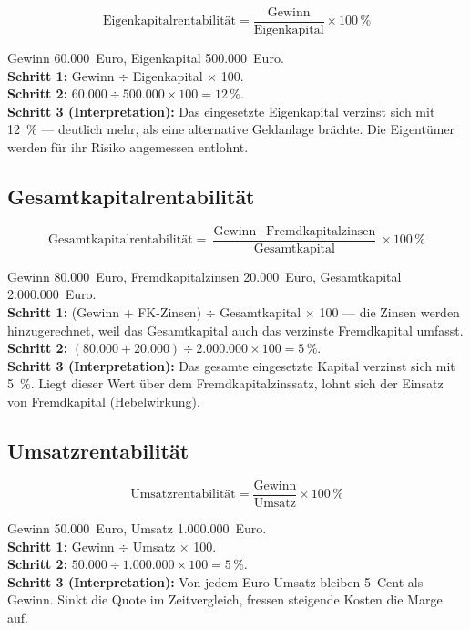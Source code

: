 \documentclass[11pt, a4paper]{article}
\begin{document}
\[
\mbox{Eigenkapitalrentabilität} = \frac{\mbox{Gewinn}}{\mbox{Eigenkapital}} \times 100\,\%
\]

\begin{beispiel}[title={Beispiel: Eigenkapitalrentabilität}]
Gewinn 60.000~Euro, Eigenkapital 500.000~Euro.\\
\textbf{Schritt 1:} Gewinn $\div$ Eigenkapital $\times$ 100.\\
\textbf{Schritt 2:} $60.000 \div 500.000 \times 100 = 12\,\%$.\\
\textbf{Schritt 3 (Interpretation):} Das eingesetzte Eigenkapital verzinst sich mit
12~\% --- deutlich mehr, als eine alternative Geldanlage brächte. Die Eigentümer werden
für ihr Risiko angemessen entlohnt.
\end{beispiel}

\subsection{Gesamtkapitalrentabilität}

\[
\mbox{Gesamtkapitalrentabilität} =
\frac{\mbox{Gewinn} + \mbox{Fremdkapitalzinsen}}{\mbox{Gesamtkapital}} \times 100\,\%
\]

\begin{beispiel}[title={Beispiel: Gesamtkapitalrentabilität}]
Gewinn 80.000~Euro, Fremdkapitalzinsen 20.000~Euro, Gesamtkapital 2.000.000~Euro.\\
\textbf{Schritt 1:} (Gewinn + FK-Zinsen) $\div$ Gesamtkapital $\times$ 100 --- die
Zinsen werden hinzugerechnet, weil das Gesamtkapital auch das verzinste Fremdkapital
umfasst.\\
\textbf{Schritt 2:} $(80.000 + 20.000) \div 2.000.000 \times 100 = 5\,\%$.\\
\textbf{Schritt 3 (Interpretation):} Das gesamte eingesetzte Kapital verzinst sich mit
5~\%. Liegt dieser Wert über dem Fremdkapitalzinssatz, lohnt sich der Einsatz von
Fremdkapital (Hebelwirkung).
\end{beispiel}

\subsection{Umsatzrentabilität}

\[
\mbox{Umsatzrentabilität} = \frac{\mbox{Gewinn}}{\mbox{Umsatz}} \times 100\,\%
\]

\begin{beispiel}[title={Beispiel: Umsatzrentabilität}]
Gewinn 50.000~Euro, Umsatz 1.000.000~Euro.\\
\textbf{Schritt 1:} Gewinn $\div$ Umsatz $\times$ 100.\\
\textbf{Schritt 2:} $50.000 \div 1.000.000 \times 100 = 5\,\%$.\\
\textbf{Schritt 3 (Interpretation):} Von jedem Euro Umsatz bleiben 5~Cent als Gewinn.
Sinkt die Quote im Zeitvergleich, fressen steigende Kosten die Marge auf.
\end{beispiel}
\end{document}
